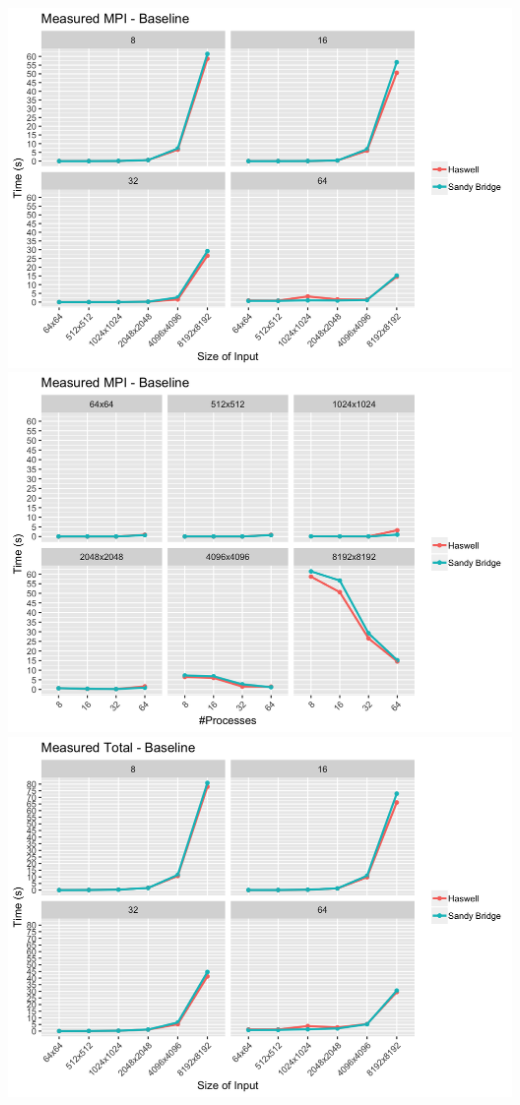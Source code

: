 \documentclass[10pt, letterpaper, twoside]{article}
\begin{document}
\begin{titlepage}
\begin{enumerate}
\vspace{5mm}
\includegraphics[scale = 0.18]{Baseline_Measured-MPI_Processes.png}
\includegraphics[scale = 0.18]{Baseline_Measured-MPI_InputSize.png}
\vspace{5mm}
\includegraphics[scale = 0.18]{Baseline_Measured-Total_Processes.png}

\end{enumerate}
\end{titlepage}
\end{document}
